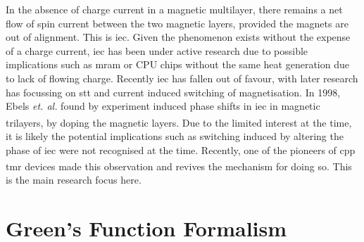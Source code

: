 \documentclass[a4paper, 12pt]{article}
\newcommand{\site}[1]{\textsuperscript{\textcolor{blue}{\cite{#1}}}}
\begin{document}
	\par In the absence of charge current in a magnetic multilayer, there remains a net flow of spin current between the two magnetic layers, provided the magnets are out of alignment. This is \gls{iec}. Given the phenomenon exists without the expense of a charge current, \gls{iec} has been under active research due to possible implications such as \gls{mram} or CPU chips without the same heat generation due to lack of flowing charge. Recently \gls{iec} has fallen out of favour, with later research has focussing on \gls{stt} and current induced switching of magnetisation. In 1998, Ebels \textit{et. al.} found by experiment induced phase shifts in \gls{iec} in magnetic trilayers, by doping the magnetic layers\site{ebels}. Due to the limited interest at the time, it is likely the potential implications such as switching induced by altering the phase of \gls{iec} were not recognised at the time. Recently, one of the pioneers of \gls{cpp} \gls{tmr} devices made this observation and revives the mechanism for doing so\textsuperscript{\textcolor{blue}{\cite{AUphase}}}. This is the main research focus here.
	\section{Green's Function Formalism}
\end{document}
